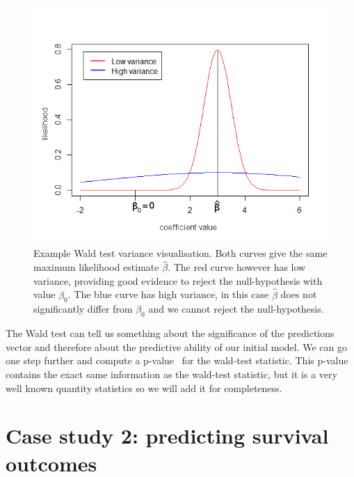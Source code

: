 \begin{figure}
	\centering
	\includegraphics[scale=.7]{images/wald_test}
	\caption{Example Wald test variance visualisation. Both curves give the same maximum likelihood estimate $\hat{\beta}$. The red curve however has low variance, providing good evidence to reject the null-hypothesis with value $\beta_{0}$. The blue curve has high variance, in this case $\hat{\beta}$ does not significantly differ from $\beta_{0}$ and we cannot reject the null-hypothesis.}
	\label{fig:evaluation-wald-test}
\end{figure}
The Wald test can tell us something about the significance of the predictions vector and therefore about the predictive ability of our initial model. We can go one step further and compute a p-value~\cite{pvalue1}\cite{wikip} for the wald-test statistic. This p-value contains the exact same information as the wald-test statistic, but it is a very well known quantity statistics so we will add it for completeness.
\section{Case study 2: predicting survival outcomes}
\label{sec:evaluation-predictingsurvival}

